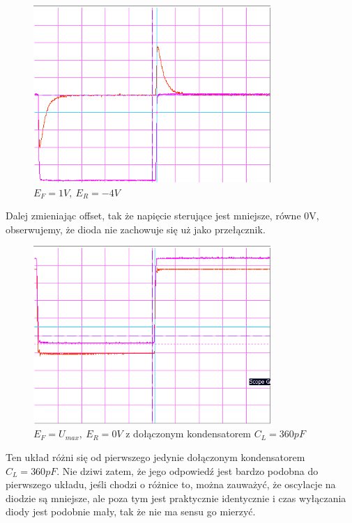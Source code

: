 \documentclass[a4paper,11pt]{article}
\begin{document}
\begin{figure} [H]
  \begin{center}
    \includegraphics[width = 9cm]{../Obrazki_i_tekst/obrobione/1dsciety.png}
    \caption{\( E_F = 1V, \ E_R = -4 V\)}
  \end{center}
\end{figure}

Dalej zmieniając offset, tak że napięcie sterujące jest mniejsze, równe 0V, obserwujemy, że dioda nie zachowuje się uż jako przełącznik.

\begin{figure} [H]
  \begin{center}
    \includegraphics[width = 9cm]{../Obrazki_i_tekst/obrobione/1esciety.png}
    \caption{\( E_F = U_{max}, \ E_R = 0V \) z dołączonym kondensatorem \(C_L = 360 pF\)}
  \end{center}
\end{figure}

Ten układ różni się od pierwszego jedynie dołączonym kondensatorem \(C_L = 360 pF\). Nie dziwi zatem, że jego odpowiedź jest bardzo podobna do pierwszego układu, jeśli chodzi o różnice to, można zauważyć, że oscylacje na diodzie są mniejsze, ale poza tym jest praktycznie identycznie i czas wyłączania diody jest podobnie mały, tak że nie ma sensu go mierzyć.
\end{document}
